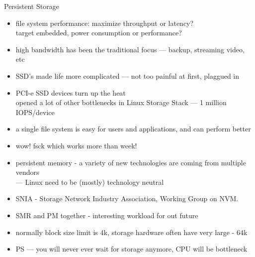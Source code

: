 \documentclass[aspectratio=169]{beamer}
\begin{document}
\begin{frame}{Persistent Storage}
  \begin{itemize}
  \item file system performance: maximize throughput or latency?
        \\target embedded, power consumption or performance?
  \item high bandwidth has been the traditional focus --- backup, streaming video, etc
  \item SSD's made life more complicated --- not too painful at first, plaggued in
  \item PCI-e SSD devices turn up the heat
        \\opened a lot of other bottlenecks in Linux Storage Stack --- 1 million IOPS/device
  \item a single file system is easy for users and applications, and can perform better
  \item wow! fsck which works more than week!
  \item persistent memory - a variety of new technologies are coming from multiple vendors
        \\--- Linux need to be (mostly) technology neutral
  \item SNIA - Storage Network Industry Association, Working Group on NVM.
  \item SMR and PM together - interesting workload for out future
  \item normally block size limit is 4k, storage hardware often have very large - 64k
  \item PS --- you will never ever wait for storage anymore, CPU will be bottleneck
  \end{itemize}
\end{frame} 
\end{document}
